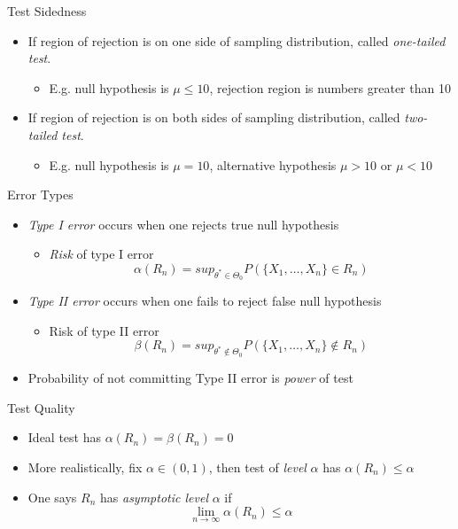 \documentclass{beamer}
\begin{document}
\begin{frame}{Test Sidedness} 
\begin{itemize} 
 \item If region of rejection is on one side of sampling distribution, called \emph{one-tailed test}. 
\begin{itemize}
\item E.g. null hypothesis is $\mu \leq  10$, rejection region is numbers greater than 10
\end{itemize} 
\item If region of rejection is on both sides of sampling distribution,  called \emph{two-tailed test}. 
\begin{itemize}
\item E.g. null hypothesis is $\mu = 10$, alternative hypothesis $\mu > 10$ or $\mu < 10$ 
\end{itemize} 
\end{itemize}
\end{frame}

\begin{frame}{Error Types}  
\begin{itemize} 
 \item \emph{Type I error} occurs when one rejects true null hypothesis 
 \begin{itemize}
 \item \emph{Risk} of type I error 
\begin{displaymath} 
\alpha(R_n) = sup_{\theta^* \in \Theta_0} P(\{X_1, \ldots, X_n\} \in R_n) 
\end{displaymath} 
 \end{itemize} 
 \item\emph{Type II error} occurs when one fails to reject false null hypothesis
  \begin{itemize}
 \item Risk of type II error 
\begin{displaymath} 
\beta(R_n) = sup_{\theta^* \notin \Theta_0} P(\{X_1, \ldots, X_n\} \notin R_n)                             
\end{displaymath}
 \end{itemize} 
 \item Probability of not committing Type II error is  \emph{power} of test
 
\end{itemize}
\end{frame}

\begin{frame}{Test Quality}
\begin{itemize} 
 \item Ideal test has $\alpha(R_n) = \beta(R_n) = 0$
 \item More realistically, fix $\alpha \in (0, 1)$, then test of \emph{level} $\alpha$ has $\alpha(R_n) \leq \alpha$ 
 \item One says $R_n$ has \emph{asymptotic level} $\alpha$ if 
\begin{displaymath} 
\lim_{n \rightarrow \infty} \alpha(R_n) \leq \alpha
\end{displaymath}
\end{itemize} 
\end{frame}
\end{document}
